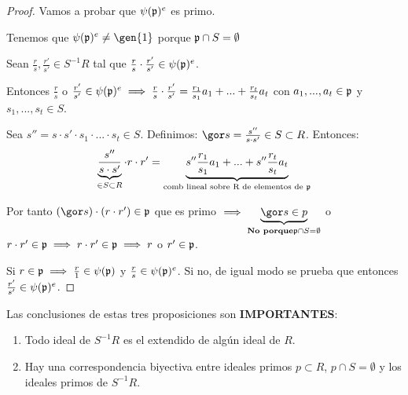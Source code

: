 \begin{proof}
	Vamos a probar que $\psi(\mathfrak{p})^e$ es primo.

	Tenemos que $\psi(\pideal)^e\neq \gen{1}$ porque $\mathfrak{p} \cap S= \emptyset$

	Sean $\frac{r}{s},\frac{r'}{s'} \in S^{-1}R$ tal que $\frac{r}{s}\cdot\frac{r'}{s'} \in \psi(\mathfrak{p})^e$.

	Entonces $\frac{r}{s}$ o $\frac{r'}{s'} \in \psi(\mathfrak{p})^e \implies \frac{r}{s}\cdot\frac{r'}{s'}=\frac{r_1}{s_1}a_1+...+\frac{r_t}{s_t}a_t$ con $a_1,...,a_t \in \mathfrak{p}$ y $s_1,...,s_t \in S$.

	Sea $s''=s\cdot s' \cdot s_1 \cdot...\cdot s_t \in S$. Definimos: $\cls{s}=\frac{s''}{s\cdot s'} \in S \subset R$. Entonces:
	$$ \underbrace{\frac{s''}{s\cdot s'}}_{\in S \subset R}\cdot r \cdot r'=\underbrace{s''\frac{r_1}{s_1}a_1+...+s''\frac{r_t}{s_t}a_t}_{\text{comb lineal sobre R de elementos de }\mathfrak{p}} $$

	Por tanto $(\cls{s})\cdot(r \cdot r') \in \pideal$ que es primo $\implies \underbrace{\cls{s}\in p}_{\textbf{No porque}\pideal \cap S = \emptyset}$ o $r\cdot r' \in \mathfrak{p} \implies r \cdot r' \in \mathfrak{p} \implies r$ o $r' \in \mathfrak{p}$.

	Si $r \in \mathfrak{p} \implies \frac{r}{1} \in \psi(\mathfrak{p})$ y $\frac{r}{s} \in \psi(\mathfrak{p})^e$. Si no, de igual modo se prueba que entonces $\frac{r'}{s'}\in \psi(\mathfrak{p})^e$.
\end{proof}

Las conclusiones de estas tres proposiciones son \textbf{IMPORTANTES}:
\begin{enumerate}
	\item Todo ideal de $S^{-1}R$ es el extendido de algún ideal de $R$.
	\item Hay una correspondencia biyectiva entre ideales primos $p \subset R$, $p \cap S = \emptyset$ y los ideales primos de $S^{-1}R$.
\end{enumerate}

